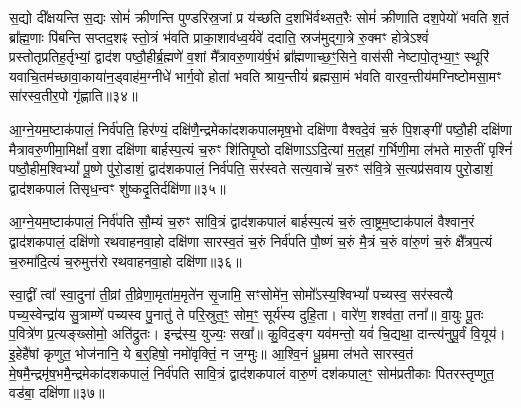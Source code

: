 {\anuvakamend[{आ॒ग्ने॒यं द्विच॑त्वारिꣳशत्॥17॥}]}

स॒द्यो दी᳚क्षयन्ति स॒द्यः सोमं॑ क्रीणन्ति पुण्डरिस्र॒जां प्र य॑च्छति द॒शभि॑र्वथ्सत॒रैः सोमं॑ क्रीणाति दश॒पेयो॑ भवति श॒तं ब्रा᳚ह्म॒णाः पि॑बन्ति सप्तद॒शꣴ स्तो॒त्रं भ॑वति प्राका॒शाव॑ध्व॒र्यवे॑ ददाति॒ स्रज॑मुद्गा॒त्रे रु॒क्मꣳ होत्रे\-ऽश्वं॑ प्रस्तोतृप्रतिह॒र्तृभ्यां॒ द्वाद॑श पष्ठौ॒हीर्ब्र॒ह्मणे॑ व॒शां मै᳚त्रावरु॒णाय॑र्\mbox{}ष॒भं ब्रा᳚ह्मणाच्छ॒ꣳ॒सिने॒ वास॑सी नेष्टापो॒तृभ्या॒ꣳ॒ स्थूरि॑ यवाचि॒तम॑च्छावा॒काया॑न॒ड्वाह॑म॒ग्नीधे॑ भार्ग॒वो होता॑ भवति श्राय॒न्तीयं॑ ब्रह्मसा॒मं भ॑वति वारव॒न्तीय॑मग्निष्टोमसा॒मꣳ सा॑रस्व॒तीर॒पो गृ॑ह्णाति॥३४॥

{\anuvakamend[{वा॒र॒व॒न्तीयं॑ च॒त्वारि॑ च॥18॥}]}

आ॒ग्ने॒यम॒ष्टाक॑पालं॒ निर्व॑पति॒ हिर॑ण्यं॒ दक्षि॑णै॒न्द्रमेका॑दशकपालमृष॒भो दक्षि॑णा वैश्वदे॒वं च॒रुं पि॒शङ्गी॑ पष्ठौ॒ही दक्षि॑णा मैत्रावरु॒णीमा॒मिक्षां᳚ व॒शा दक्षि॑णा बार्\mbox{}हस्प॒त्यं च॒रुꣳ शि॑तिपृ॒ष्ठो दक्षि॑णा\-ऽ\-ऽदि॒त्यां म॒ल्॒\mbox{}हां ग॒र्भिणी॒मा ल॑भते मारु॒तीं पृश्निं॑ पष्ठौ॒हीम॒श्वि\-भ्यां᳚ पू॒ष्णे पु॑रो॒डाशं॒ द्वाद॑शकपालं॒ निर्व॑पति॒ सर॑स्वते सत्य॒वाचे॑ च॒रुꣳ स॑वि॒त्रे स॒त्यप्र॑सवाय पुरो॒डाशं॒ द्वाद॑शकपालं तिसृध॒न्वꣳ शु॑ष्कदृ॒तिर्दक्षि॑णा॥३५॥

{\anuvakamend[{आ॒ग्ने॒यꣳ स॒प्तच॑त्वारिꣳशत्॥19॥}]}

आ॒ग्ने॒यम॒ष्टाक॑पालं॒ निर्व॑पति सौ॒म्यं च॒रुꣳ सा॑वि॒त्रं द्वाद॑शकपालं बार्\mbox{}हस्प॒त्यं च॒रुं त्वा॒ष्ट्रम॒ष्टाक॑पालं वैश्वान॒रं द्वाद॑शकपालं॒ दक्षि॑णो रथवाहनवा॒हो दक्षि॑णा सारस्व॒तं च॒रुं निर्व॑पति पौ॒ष्णं च॒रुं मै॒त्रं च॒रुं वा॑रु॒णं च॒रुं क्षै᳚त्रप॒त्यं च॒रुमा॑दि॒त्यं च॒रुमुत्त॑रो रथवाहनवा॒हो दक्षि॑णा॥३६॥

{\anuvakamend[{आ॒ग्ने॒यं चतु॑स्त्रिꣳशत्॥20॥}]}

स्वा॒द्वीं त्वा᳚ स्वा॒दुना॑ ती॒व्रां ती॒व्रेणा॒मृता॑म॒मृते॑न सृ॒जामि॒ सꣳसोमे॑न॒ सोमो᳚\-ऽस्य॒श्वि\-भ्यां᳚ पच्यस्व॒ सर॑स्वत्यै पच्य॒स्वेन्द्रा॑य सु॒त्राम्णे॑ पच्यस्व पु॒नातु॑ ते परि॒स्रुत॒ꣳ॒ सोम॒ꣳ॒ सूर्य॑स्य दुहि॒ता। वारे॑ण॒ शश्व॑ता॒ तना᳚॥ वा॒युः पू॒तः प॒वित्रे॑ण प्र॒त्यङ्ख्सोमो॒ अति॑द्रुतः। इन्द्र॑स्य॒ युज्यः॒ सखा᳚॥ कु॒विद॒ङ्ग यव॑मन्तो॒ यवं॑ चि॒द्यथा॒ दान्त्य॑नुपू॒र्वं वि॒यूय॑। इ॒हेहै॑षां कृणुत॒ भोज॑नानि॒ ये ब॒र्॒\mbox{}हिषो॒ नमो॑वृक्तिं॒ न ज॒ग्मुः॥ आ॒श्वि॒नं धू॒म्रमा ल॑भते सारस्व॒तं मे॒षमै॒न्द्रमृ॑ष॒भमै॒न्द्रमेका॑दशकपालं॒ निर्व॑पति सावि॒त्रं द्वाद॑शकपालं वारु॒णं दश॑कपाल॒ꣳ॒ सोम॑प्रतीकाः पितरस्तृप्णुत॒ वड॑बा॒ दक्षि॑णा॥३७॥

{\anuvakamend[{भोज॑नानि॒ षड््विꣳ॑शतिश्च॥21॥}]}

